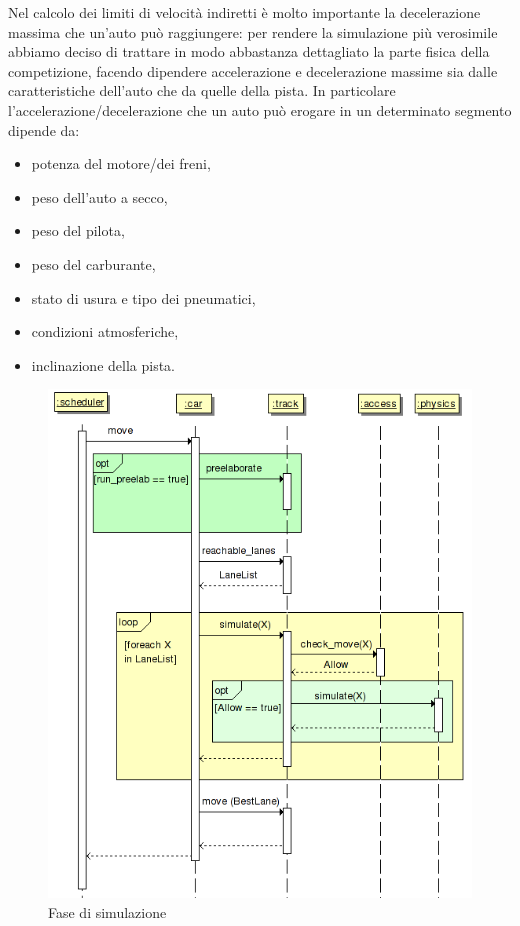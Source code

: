 Nel calcolo dei limiti di velocità indiretti è molto importante la decelerazione massima che un'auto può raggiungere: per rendere la simulazione più verosimile abbiamo deciso di trattare in modo abbastanza dettagliato la parte fisica della competizione, facendo dipendere accelerazione e decelerazione massime sia dalle caratteristiche dell'auto che da quelle della pista.
In particolare l'accelerazione/decelerazione che un auto può erogare in un determinato segmento dipende da:
\begin{itemize}
\item potenza del motore/dei freni,
\item peso dell'auto a secco,
\item peso del pilota,
\item peso del carburante,
\item stato di usura e tipo dei pneumatici,
\item condizioni atmosferiche,
\item inclinazione della pista.
\end{itemize}

\begin{figure}
\includegraphics[width=\textwidth]{diagrammi/Simulation}
\caption{Fase di simulazione}
\label{fig:simulation}
\end{figure}

